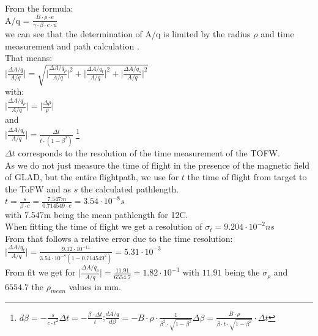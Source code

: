\documentclass[12pt, letterpaper]{article}
\begin{document}
From the formula:\\
A/q = $\frac{B \cdot \rho \cdot e}{\gamma\cdot\beta \cdot c \cdot u}$ \\
we can see that the determination of A/q is limited by the radius $\rho$ and time measurement and path calculation .\\
That means:\\
\newline
$\Big|\frac{\Delta A/q}{A/q}\Big| = \sqrt{\big|\frac{\Delta A/q_{\rho}}{A/q}\big|^{2} + \big|\frac{\Delta A/q_{t}}{A/q}\big|^{2} +\big|\frac{\Delta A/q_{s}}{A/q} \big|^{2}  }$ \\
with:\\
$\big|\frac{\Delta A/q_{\rho}}{A/q}\big| = \big|\frac{\Delta\rho}{\rho}\big|$\\
and\\
$\big|\frac{\Delta A/q_{t}}{A/q}\big| = \frac{\Delta t}{t\cdot(1-\beta^{2})}$ \footnote{$d\beta = -\frac{s}{c\cdot t^{2}}\Delta t = -\frac{\beta \cdot \Delta t}{t}$;\hspace{1cm}$\frac{dA/q}{d\beta} = -B\cdot\rho\cdot\frac{1}{\beta^{2}\cdot\sqrt{1-\beta^{2}}}\Delta\beta = \frac{B\cdot \rho}{\beta \cdot t \cdot \sqrt{1-\beta^{2}}}\cdot \Delta t$}\\
$\Delta t$ corresponds to the resolution of the time measurement of the TOFW.\\
As we do not just measure the time of flight in the presence of the magnetic field of GLAD, but the entire flightpath, we use for $t$ the time of flight from target to the ToFW and as $s$ the calculated pathlength. \\
$t = \frac{s}{\beta\cdot c} =  \frac{7.547m}{0.714549\cdot c} = 3.54\cdot10^{-8}s$\\
with 7.547m being the mean pathlength for 12C.\\
When fitting the time of flight we get a resolution of $\sigma_{t} = 9.204 \cdot 10^{-2}ns$\\
From that follows a relative error due to the time resolution:\\
$\big|\frac{\Delta A/q_{t}}{A/q}\big| = \frac{9.12 \cdot10^{-11}}{3.54\cdot10^{-8}(1-0.714549^{2})} = 5.31\cdot10^{-3}$\\
\newline
From fit we get  for  $\big|\frac{\Delta A/q_{\rho}}{A/q}\big| = \frac{11.91}{6554.7} = 1.82\cdot 10^{-3}$ with $11.91$ being the $ \sigma_{\rho}$ and $6554.7$ the $\rho_{mean}$ values in mm.\\
\newline
\end{document}
